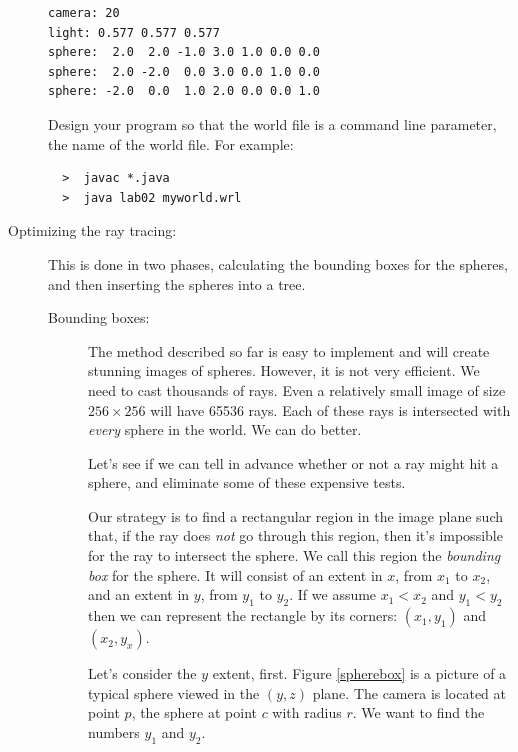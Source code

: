 \documentclass{article}
\begin{document}
\begin{description}
  \begin{Verbatim}[frame=single,label=myworld.wrl]
camera: 20
light: 0.577 0.577 0.577
sphere:  2.0  2.0 -1.0 3.0 1.0 0.0 0.0
sphere:  2.0 -2.0  0.0 3.0 0.0 1.0 0.0
sphere: -2.0  0.0  1.0 2.0 0.0 0.0 1.0
\end{Verbatim}

Design your program so that the world file is a command line parameter, 
the name of the world file.  For example:
\begin{Verbatim}
  >  javac *.java
  >  java lab02 myworld.wrl
\end{Verbatim}

\item[Optimizing the ray tracing:]  This is done in two phases,
  calculating the bounding boxes for the spheres, and then inserting
  the spheres into a tree.

  \begin{description}
    \item[Bounding boxes:]
  The method described so far is easy to implement and will create
  stunning images of spheres.  However, it is not very efficient.  We
  need to cast thousands of rays.  Even a relatively small image of
  size $256\times256$ will have 65536 rays.  Each of these rays is
  intersected with {\em every} sphere in the world.  We can do better.

  Let's see if we can tell in advance whether or not a ray might hit a
  sphere, and eliminate some of these expensive tests.

Our strategy is to find a rectangular region in the image plane such
that, if the ray does {\em not} go through this region, then it's
impossible for the ray to intersect the sphere.  We call this region
the {\em bounding box} for the sphere.  It will consist of an extent
in $x$, from $x_1$ to $x_2$, and an extent in $y$, from $y_1$ to
$y_2$.  If we assume   $x_1 < x_2$ and $y_1 < y_2$ then we can
represent the rectangle by its corners: $(x_1,y_1)$ and $(x_2, y_x)$.  

Let's consider the $y$ extent, first.  Figure \ref{spherebox} is a
picture of a typical sphere viewed in the $(y,z)$ plane.  The camera is
located at point $p$, the sphere at point $c$ with radius $r$.  We
want to find the numbers $y_1$ and $y_2$.




\end{description}
\end{description}
\end{document}
